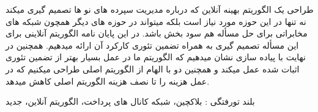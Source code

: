 طراحی یک الگوریتم بهینه آنلاین که درباره مدیریت سپرده های نو ها تصمیم گیری میکند نه تنها در این حوزه مورد نیاز است بلکه میتواند در حوزه های دیگر همچون شبکه های مخابراتی برای حل مسأله   هم سود بخش باشد. در این پایان نامه الگوریتم آنلاینی برای این مسأله تصمیم گیری به همراه تضمین تئوری کارکرد آن ارائه میدهیم. همچنین در نهایت با پیاده سازی نشان میدهیم که الگوریتم ما در عمل بسیار بهتر از تضمین تئوری اثبات شده عمل میکند و همچنین دو  با الهام از الگوریتم اصلی طراحی میکنیم که در عمل هزینه را تا نصف هزینه الگوریتم اصلی کاهش میدهد.
 
‌بلند
‌تورفتگی : 
بلاکچین، شبکه کانال های پرداخت، الگوریتم آنلاین، 
‌جدید
